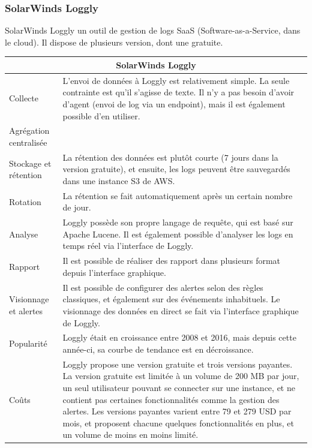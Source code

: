 \documentclass[paper=a4, fontsize=11pt]{scrartcl}
\begin{document}
\subsubsection{SolarWinds Loggly}
SolarWinds Loggly un outil de gestion de logs SaaS (Software-as-a-Service, dans le cloud). Il dispose de plusieurs version, dont une gratuite.

\centering
\begin{tabular}{ |p{4cm}||p{12cm}|  }
    \hline
    \multicolumn{2}{|c|}{SolarWinds Loggly} \\
    \hline
    Collecte & L'envoi de données à Loggly est relativement simple. La seule contrainte est qu'il s'agisse de texte. Il n'y a pas besoin d'avoir d'agent (envoi de log via un endpoint), mais il est également possible d'en utiliser.\\
    \hline
    Agrégation centralisée & \\
    \hline
    Stockage et rétention & La rétention des données est plutôt courte (7 jours dans la version gratuite), et ensuite, les logs peuvent être sauvegardés dans une instance S3 de AWS.\\
    \hline
    Rotation & La rétention se fait automatiquement après un certain nombre de jour.\\
    \hline
    Analyse & Loggly possède son propre langage de requête, qui est basé sur Apache Lucene. Il est également possible d'analyser les logs en temps réel via l'interface de Loggly.\\
    \hline
    Rapport & Il est possible de réaliser des rapport dans plusieurs format depuis l'interface graphique.\\
    \hline
    Visionnage et alertes & Il est possible de configurer des alertes selon des règles classiques, et également sur des événements inhabituels. Le visionnage des données en direct se fait via l'interface graphique de Loggly.\\
    \hline
    Popularité & Loggly était en croissance entre 2008 et 2016, mais depuis cette année-ci, sa courbe de tendance est en décroissance.\\
    \hline
    Coûts & Loggly propose une version gratuite et trois versions payantes. La version gratuite est limitée à un volume de 200 MB par jour, un seul utilisateur pouvant se connecter sur une instance, et ne contient pas certaines fonctionnalités comme la gestion des alertes. Les versions payantes varient entre 79 et 279 USD par mois, et proposent chacune quelques fonctionnalités en plus, et un volume de moins en moins limité.\\
    \hline
\end{tabular}
\justify
\end{document}

